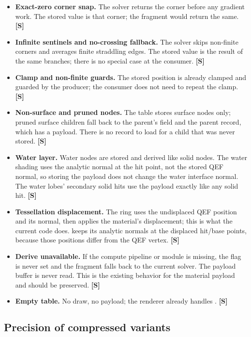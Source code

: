 \documentclass[11pt,a4paper]{article}
\newcommand{\evS}{\textsf{\textbf{\color{evS}[S]}}}
\newcommand{\code}[1]{\texttt{\detokenize{#1}}}
\theoremstyle{plain}
\theoremstyle{definition}
\theoremstyle{remark}
\begin{document}
\begin{itemize}[leftmargin=1.3em,itemsep=2pt]
\item \textbf{Exact-zero corner snap.} The solver returns the corner before
      any gradient work. The stored value is that corner; the fragment would
      return the same. \evS
\item \textbf{Infinite sentinels and no-crossing fallback.} The solver skips
      non-finite corners and averages finite straddling edges. The stored
      value is the result of the same branches; there is no special case at
      the consumer. \evS
\item \textbf{Clamp and non-finite guards.} The stored position is already
      clamped and guarded by the producer; the consumer does not need to
      repeat the clamp. \evS
\item \textbf{Non-surface and pruned nodes.} The table stores surface nodes
      only; pruned surface children fall back to the parent's field and the
      parent record, which has a payload. There is no record to load for a
      child that was never stored. \evS
\item \textbf{Water layer.} Water nodes are stored and derived like solid
      nodes. The water shading uses the analytic normal at the hit point, not
      the stored QEF normal, so storing the payload does not change the water
      interface normal. The water lobes' secondary solid hits use the payload
      exactly like any solid hit. \evS
\item \textbf{Tessellation displacement.} The ring uses the undisplaced QEF
      position and its normal, then applies the material's displacement; this
      is what the current code does. \code{rmResolveHitShading} keeps its
      analytic normals at the displaced hit/base points, because those
      positions differ from the QEF vertex. \evS
\item \textbf{Derive unavailable.} If the compute pipeline or module is
      missing, the flag is never set and the fragment falls back to the
      current solver. The payload buffer is never read. This is the existing
      behavior for the material payload and should be preserved. \evS
\item \textbf{Empty table.} No draw, no payload; the renderer already handles
      \code{rootCounts_ == 0}. \evS
\end{itemize}

\subsection{Precision of compressed variants}
\end{document}
